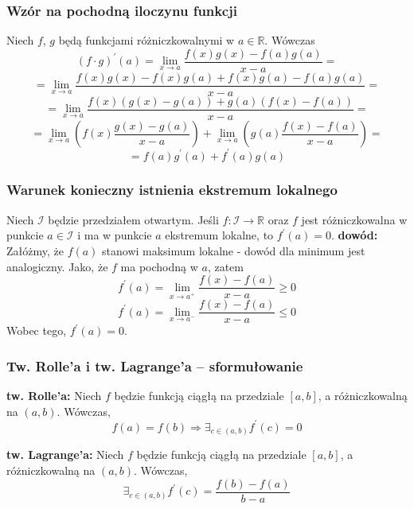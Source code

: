 \documentclass[11pt]{beamer}
\newcommand{\below}[1]{\displaystyle\mathop{#1}}
\begin{document}
\begin{frame}
\frametitle{Wzór na pochodną iloczynu funkcji}
Niech $f$, $g$ będą funkcjami różniczkowalnymi w $a \in \mathbb{R}$. Wówczas
\[
	(f \cdot g)^\prime(a) = \below{\lim}_{x \rightarrow a}\frac{f(x)g(x) - f(a)g(a)}{x - a} = 
\]
\[
	= \below{\lim}_{x \rightarrow a}\frac{f(x)g(x)-f(x)g(a)+f(x)g(a)-f(a)g(a)}{x-a} = 
\]
\[
= \below{\lim}_{x \rightarrow a}\frac{f(x)\left(g(x)-g(a)\right)+g(a)\left(f(x)-f(a)\right)}{x-a} = 
\]
\[
=  \below{\lim}_{x \rightarrow a} \left(f(x)\frac{g(x)-g(a)}{x-a}\right) +  \below{\lim}_{x \rightarrow a} \left( g(a) \frac{f(x)-f(a)}{x-a}\right) = 
\]
\[
= f(a)g^\prime(a) + f^\prime(a)g(a)
\]
\end{frame}
\begin{frame}
\frametitle{Warunek konieczny istnienia ekstremum lokalnego}
Niech $\mathcal{I}$ będzie przedziałem otwartym. Jeśli $f : \mathcal{I} \rightarrow \mathbb{R}$ oraz $f$ jest różniczkowalna w punkcie $a \in \mathcal{I}$ i ma w punkcie $a$ ekstremum lokalne, to $f^\prime(a) = 0$.
\newline
{\bf dowód:} Załóżmy, że $f(a)$ stanowi maksimum lokalne - dowód dla minimum jest analogiczny. Jako, że $f$ ma pochodną w $a$, zatem
\[
f^\prime(a) = \below{\lim}_{x\rightarrow a^+} \frac{f(x)-f(a)}{x-a} \geq 0
\]
\[
f^\prime(a) = \below{\lim}_{x\rightarrow a^-} \frac{f(x)-f(a)}{x-a} \leq 0
\]
Wobec tego, $f^\prime(a) = 0$.
\end{frame}
\begin{frame}
\frametitle{Tw. Rolle'a i tw. Lagrange'a -- sformułowanie}
{\bf tw. Rolle'a:}
Niech $f$ będzie funkcją ciągłą na przedziale $[a, b]$, a różniczkowalną na $(a, b)$. Wówczas,
\[
f(a) = f(b) \Rightarrow \below{\exists}_{c \in (a, b)} f^\prime(c) = 0
\]

{\bf tw. Lagrange'a:}
Niech $f$ będzie funkcją ciągłą na przedziale $[a, b]$, a różniczkowalną na $(a, b)$. Wówczas,
\[
\below{\exists}_{c \in (a, b)} f^\prime(c) = \frac{f(b) - f(a)}{b - a}
\]

\end{frame}
\end{document}
